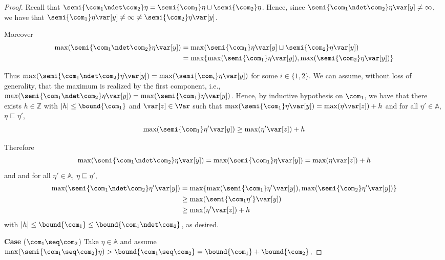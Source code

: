 \begin{proof}
  Recall that
  \(\semi{\com_1 \ndet \com_2} \eta = \semi{\com_1}\eta \sqcup \semi{\com_2}\eta\).
  Hence, since \(\semi{\com_1 \ndet \com_2} \eta \var[y] \neq \infty\), we have
  that \(\semi{\com_1} \eta \var[y] \neq \infty \neq \semi{\com_2}\eta \var[y]\).

  Moreover
  \begin{align*}
    \max(\semi{\com_1 \ndet \com_2}\eta \var[y])& =  \max(\semi{\com_1}\eta \var[y] \sqcup \semi{\com_2}\eta \var[y]) \\ 
    & = \max \{ \max(\semi{\com_1}\eta \var[y]), \max(\semi{\com_2}\eta \var[y])\}
  \end{align*}

  Thus
  \(\max(\semi{\com_1 \ndet \com_2}\eta \var[y]) =
  \max(\semi{\com_i}\eta \var[y])\) for some \(i \in \{1,2\}\). We can
  assume, without loss of generality, that the maximum is realized
  by the first component, i.e.,
  \(\max(\semi{\com_1 \ndet \com_2}\eta \var[y]) =
  \max(\semi{\com_1}\eta \var[y])\). Hence, by inductive hypothesis on
  \(\com_1\), we have that there exists \(h \in \mathbb{Z}\) with
  \(|h| \leq \bound{\com_1}\) and \(\var[z] \in \Var\) such that
  \(\max(\semi{\com_1}\eta \var[y]) = \max(\eta \var[z]) + h\) and for
  all \(\eta' \in \mathbb{A}\), \(\eta \sqsubseteq \eta'\),
  \[
  \max(\semi{\com_1}\eta' \var[y]) \geq \max(\eta' \var[z]) + h
  \]

  Therefore 
  \[
  \max(\semi{\com_1 \ndet \com_2}\eta \var[y])
  = \max(\semi{\com_1}\eta \var[y]) = \max(\eta \var[z]) + h
  \]
  and and for
  all \(\eta' \in \mathbb{A}\), \(\eta \sqsubseteq \eta'\),
  \begin{align*}
    \max(\semi{\com_1 \ndet \com_2}\eta' \var[y])
    &= \max\{ \max(\semi{\com_1}\eta' \var[y]),  \max(\semi{\com_2}\eta' \var[y])\}\\
    & \geq \max(\semi{\com_1\eta'} \var[y])\\
    & \geq \max(\eta' \var[z]) + h
  \end{align*}
  with \(|h| \leq \bound{\com_1} \leq \bound{\com_1 \ndet \com_2}\), as desired.

  
  \medskip
  
  \noindent
  \textbf{Case} (\(\com_1 \seq \com_2\))
  Take \(\eta \in \mathbb{A}\) and assume
  \(\max(\semi{\com_1 \seq \com_2}\eta) > \bound{\com_1 \seq \com_2} =
  \bound{\com_1} + \bound{\com_2}\).
  

\end{proof}
